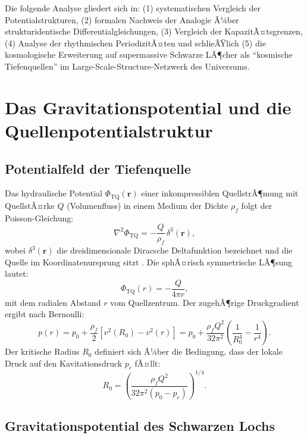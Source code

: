 ﻿\documentclass[12pt,a4paper]{report}
\begin{document}
Die folgende Analyse gliedert sich in: (1) systematischen Vergleich der Potentialstrukturen, (2) formalen Nachweis der Analogie Ã¼ber strukturidentische Differentialgleichungen, (3) Vergleich der KapazitÃ¤tsgrenzen, (4) Analyse der rhythmischen PeriodizitÃ¤ten und schlieÃŸlich (5) die kosmologische Erweiterung auf supermassive Schwarze LÃ¶cher als ``kosmische Tiefenquellen'' im Large-Scale-Structure-Netzwerk des Universums.

\section{Das Gravitationspotential und die Quellenpotentialstruktur}

\subsection{Potentialfeld der Tiefenquelle}

Das hydraulische Potential $\Phi_{\mathrm{TQ}}(\mathbf{r})$ einer inkompressiblen QuellstrÃ¶mung mit QuellstÃ¤rke $Q$ (Volumenfluss) in einem Medium der Dichte $\rho_f$ folgt der Poisson-Gleichung:
\begin{equation}
	\nabla^2 \Phi_{\mathrm{TQ}} = -\frac{Q}{\rho_f}\,\delta^3(\mathbf{r}),
	\label{eq:poisson_tq}
\end{equation}
wobei $\delta^3(\mathbf{r})$ die dreidimensionale Diracsche Deltafunktion bezeichnet und die Quelle im Koordinatenursprung sitzt \cite{lamb1932,white2011}. Die sphÃ¤risch symmetrische LÃ¶sung lautet:
\begin{equation}
	\Phi_{\mathrm{TQ}}(r) = -\frac{Q}{4\pi r},
	\label{eq:potential_tq}
\end{equation}
mit dem radialen Abstand $r$ vom Quellzentrum. Der zugehÃ¶rige Druckgradient ergibt nach Bernoulli:
\begin{equation}
	p(r) = p_0 + \frac{\rho_f}{2}\left[v^2(R_0) - v^2(r)\right] = p_0 + \frac{\rho_f Q^2}{32\pi^2}\left(\frac{1}{R_0^4} - \frac{1}{r^4}\right).
	\label{eq:druck_tq}
\end{equation}
Der kritische Radius $R_0$ definiert sich Ã¼ber die Bedingung, dass der lokale Druck auf den Kavitationsdruck $p_c$ fÃ¤llt:
\begin{equation}
	R_0 = \left(\frac{\rho_f Q^2}{32\pi^2(p_0 - p_c)}\right)^{1/4}.
	\label{eq:r0_definition}
\end{equation}

\subsection{Gravitationspotential des Schwarzen Lochs}
\end{document}
